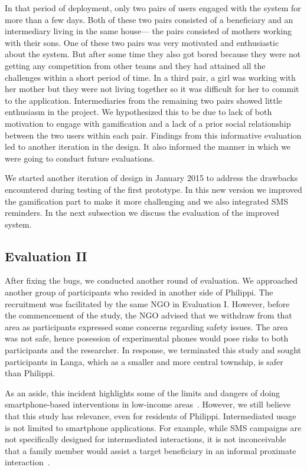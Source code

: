 \documentclass{sig-alternate}
\begin{document}
In that period of deployment, only two pairs of users engaged with the system
for more than a few days. Both of these two pairs consisted of a beneficiary 
and an  intermediary
living in the same house--- the pairs consisted of mothers working with their
sons. One of these two pairs was very motivated and enthusiastic about the
system. But after some time they also got bored because they were not getting
any competition from other teams and they had attained all the challenges
within a short period of time. In a third pair, a girl was working with her
mother but they were not living together so it was difficult for her to commit
to the application. Intermediaries from the remaining two pairs showed
little enthusiasm in the project. We hypothesized this to be due to lack of both
motivation to engage with gamification and a lack of a prior social relationship 
between
the two users within each pair. Findings from this informative evaluation led to
another iteration in the design. It also informed the manner in which we were
going to conduct future evaluations.

We started another iteration of design in January 2015 to address the
drawbacks encountered during testing of the first prototype. In this new
version we improved the gamification part to make it more challenging and we
also integrated SMS reminders. In the next subsection we discuss the
evaluation of the improved system.
 
\subsection{Evaluation II}
After fixing the bugs, we conducted another round of evaluation. We approached
another group of participants who resided in another side of Philippi. The
recruitment was facilitated by the same NGO in Evaluation I. However, before the
commencement of the study, the NGO advised that we withdraw from that area as
participants expressed some concerns regarding safety issues. The area was not
safe, hence posession of
experimental phones would pose risks to both participants and the
researcher. In response, we terminated this study and sought participants in 
Langa, which as a smaller and more central township, is safer than Philippi.

As an aside, this incident highlights some of the limits and dangers of doing 
smartphone-based interventions in low-income areas~\cite{Molapo2015}.  
However, we still believe that this study has relevance, even for residents of Philippi.  Intermediated usage is not limited to smartphone applications. For example, while SMS campaigns are not specifically designed for intermediated interactions, it is
not inconceivable that a family member would assist a target beneficiary
in an informal proximate interaction~\cite{sambasivan2010}.
\end{document}
